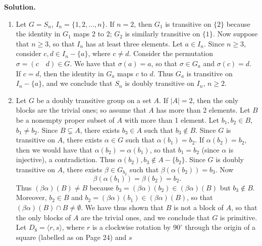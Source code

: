 \documentclass[9pt]{article}
\newcommand{\cyc}[1]{\langle #1 \rangle}
\begin{document}
\begin{enumerate}
      \textbf{Solution.}
      
      \begin{enumerate}
         \item Let $G = S_n$, $I_n = \{1, 2, \ldots, n\}$. If $n = 2$, then
               $G_1$ is transitive on $\{2\}$ because the identity in $G_1$ maps
               2 to 2; $G_2$ is similarly transitive on $\{1\}$. Now suppose
               that $n \ge 3$, so that $I_n$ has at least three elements. Let
               $a \in I_n$. Since $n \ge 3$, consider $c, d \in I_n - \{a\}$,
               where $c \neq d$. Consider the permutation
               $\sigma = (c \quad d) \in G$. We have that $\sigma(a) = a$, so
               that $\sigma \in G_a$ and $\sigma(c) = d$. If $c = d$, then the
               identity in $G_a$ maps $c$ to $d$. Thus $G_a$ is transitive on
               $I_n - \{a\}$, and we conclude that $S_n$ is doubly transitive on
               $I_n$, $n \ge 2$.
         \item Let $G$ be a doubly transitive group on a set $A$. If $|A| = 2$,
               then the only blocks are the trivial ones; so assume that $A$
               has more than 2 elements. Let $B$ be a nonempty proper subset of
               $A$ with more than 1 element. Let $b_1, b_2 \in B$,
               $b_1 \neq b_2$. Since $B \subsetneq A$, there exists $b_3 \in A$
               such that $b_3 \notin B$. Since $G$ is transitive on $A$, there
               exists $\alpha \in G$ such that $\alpha(b_1) = b_2$. If
               $\alpha(b_2) = b_2$, then we would have that
               $\alpha(b_2) = \alpha(b_1)$, so that $b_1 = b_2$ (since $\alpha$
               is injective), a contradiction. Thus
               $\alpha(b_2), b_3 \notin A - \{b_2\}$. Since $G$ is doubly
               transitive on $A$, there exists $\beta \in G_{b_2}$ such that
               $\beta(\alpha(b_2)) = b_3$. Now
               $$\beta(\alpha(b_1)) = \beta(b_2) = b_2.$$
               Thus $(\beta\alpha)(B) \neq B$ because
               $b_3 = (\beta\alpha)(b_2) \in (\beta\alpha)(B)$ but
               $b_3 \notin B$. Moreover, $b_2 \in B$ and
               $b_2 = (\beta\alpha)(b_1) \in (\beta\alpha)(B)$, so that
               $(\beta\alpha)(B) \cap B \neq \emptyset$. We have thus shown
               that $B$ is not a block of $A$, so that the only blocks of $A$
               are the trivial ones, and we conclude that $G$ is primitive. Let
               $D_8 = \cyc{r, s}$, where $r$ is a clockwise rotation by $90^\circ$
               through the origin of a square (labelled as on Page 24) and $s$

\end{enumerate}
\end{enumerate}
\end{document}
